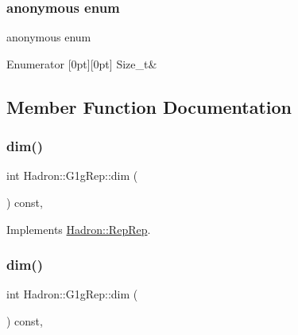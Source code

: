 \subsubsection{\texorpdfstring{anonymous enum}{anonymous enum}}
{\footnotesize\ttfamily anonymous enum}

\begin{DoxyEnumFields}{Enumerator}
[0pt][0pt]{}\mbox{\label{structHadron_1_1G1gRep_a661f805947d5452f1e9baa22c45bf6faad934a1096dd73fb4c275c40956d09166}} 
Size\+\_\+t&\\
\hline

\end{DoxyEnumFields}


\subsection{Member Function Documentation}
\mbox{\label{structHadron_1_1G1gRep_aa6f93ed967ef889de7a9f5aaad48a69b}} 
\subsubsection{\texorpdfstring{dim()}{dim()}\hspace{0.1cm}{\footnotesize\ttfamily [1/3]}}
{\footnotesize\ttfamily int Hadron\+::\+G1g\+Rep\+::dim (\begin{DoxyParamCaption}{ }\end{DoxyParamCaption}) const\hspace{0.3cm}{\ttfamily [inline]}, {\ttfamily [virtual]}}



Implements \mbox{\hyperlink{structHadron_1_1RepRep_a92c8802e5ed7afd7da43ccfd5b7cd92b}{Hadron\+::\+Rep\+Rep}}.

\mbox{\label{structHadron_1_1G1gRep_aa6f93ed967ef889de7a9f5aaad48a69b}} 
\subsubsection{\texorpdfstring{dim()}{dim()}\hspace{0.1cm}{\footnotesize\ttfamily [2/3]}}
{\footnotesize\ttfamily int Hadron\+::\+G1g\+Rep\+::dim (\begin{DoxyParamCaption}{ }\end{DoxyParamCaption}) const\hspace{0.3cm}{\ttfamily [inline]}, {\ttfamily [virtual]}}



